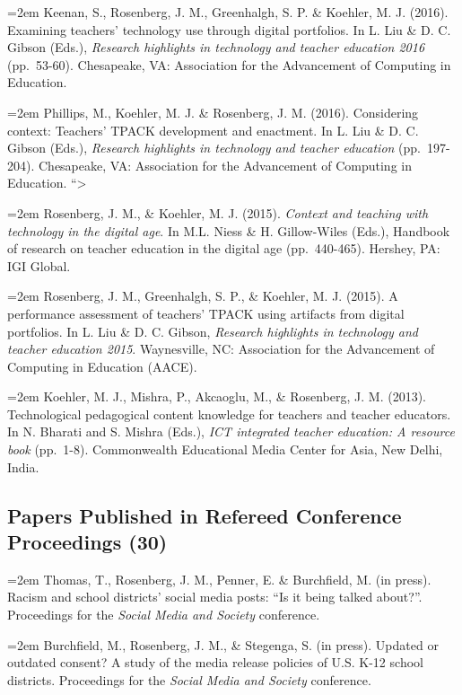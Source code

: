 \documentclass[
  14,
]{article}
\begin{document}
\hangindent=2em Keenan, S., Rosenberg, J. M., Greenhalgh, S. P. \&
Koehler, M. J. (2016). Examining teachers' technology use through
digital portfolios. In L. Liu \& D. C. Gibson (Eds.), \emph{Research
highlights in technology and teacher education 2016} (pp.~53-60).
Chesapeake, VA: Association for the Advancement of Computing in
Education.

\hangindent=2em Phillips, M., Koehler, M. J. \& Rosenberg, J. M. (2016).
Considering context: Teachers' TPACK development and enactment. In L.
Liu \& D. C. Gibson (Eds.), \emph{Research highlights in technology and
teacher education} (pp.~197-204). Chesapeake, VA: Association for the
Advancement of Computing in Education. ``\textgreater{}

\hangindent=2em Rosenberg, J. M., \& Koehler, M. J. (2015).
\emph{Context and teaching with technology in the digital age}. In M.L.
Niess \& H. Gillow-Wiles (Eds.), Handbook of research on teacher
education in the digital age (pp.~440-465). Hershey, PA: IGI Global.

\hangindent=2em Rosenberg, J. M., Greenhalgh, S. P., \& Koehler, M. J.
(2015). A performance assessment of teachers' TPACK using artifacts from
digital portfolios. In L. Liu \& D. C. Gibson, \emph{Research highlights
in technology and teacher education 2015}. Waynesville, NC: Association
for the Advancement of Computing in Education (AACE).

\hangindent=2em Koehler, M. J., Mishra, P., Akcaoglu, M., \& Rosenberg,
J. M. (2013). Technological pedagogical content knowledge for teachers
and teacher educators. In N. Bharati and S. Mishra (Eds.), \emph{ICT
integrated teacher education: A resource book} (pp.~1-8). Commonwealth
Educational Media Center for Asia, New Delhi, India.

\hypertarget{papers-published-in-refereed-conference-proceedings-30}{%
\subsection{Papers Published in Refereed Conference Proceedings
(30)}\label{papers-published-in-refereed-conference-proceedings-30}}

\hangindent=2em Thomas, T., Rosenberg, J. M., Penner, E. \& Burchfield,
M. (in press). Racism and school districts' social media posts: ``Is it
being talked about?''. Proceedings for the \emph{Social Media and
Society} conference.

\hangindent=2em Burchfield, M., Rosenberg, J. M., \& Stegenga, S. (in
press). Updated or outdated consent? A study of the media release
policies of U.S. K-12 school districts. Proceedings for the \emph{Social
Media and Society} conference.
\end{document}
